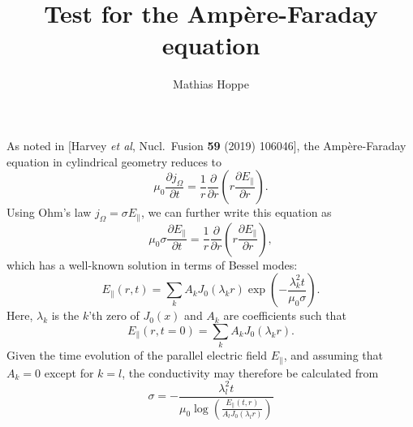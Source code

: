 \documentclass{notes}
\title{Test for the Amp\`ere-Faraday equation}
\author{Mathias Hoppe}
\begin{document}
    \maketitle

    \noindent
    As noted in [Harvey {\em et al}, Nucl.\ Fusion {\bf 59} (2019) 106046], the
    Amp\`ere-Faraday equation in cylindrical geometry reduces to
    \begin{equation}
        \mu_0\frac{\partial j_\Omega}{\partial t} = \frac{1}{r}\frac{\partial}{\partial r}\left(
            r\frac{\partial E_\parallel}{\partial r}
        \right).
    \end{equation}
    Using Ohm's law $j_\Omega = \sigma E_\parallel$, we can further write this
    equation as
    \begin{equation}
        \mu_0\sigma\frac{\partial E_\parallel}{\partial t} = \frac{1}{r}\frac{\partial}{\partial r}\left(
            r\frac{\partial E_\parallel}{\partial r}
        \right),
    \end{equation}
    which has a well-known solution in terms of Bessel modes:
    \begin{equation}
        E_\parallel(r,t) = \sum_k A_k J_0\left(\lambda_k r\right)
        \exp\left( -\frac{\lambda_k^2 t}{\mu_0\sigma} \right).
    \end{equation}
    Here, $\lambda_k$ is the $k$'th zero of $J_0(x)$ and $A_k$ are coefficients
    such that
    \begin{equation}
        E_\parallel(r,t=0) = \sum_k A_k J_0(\lambda_k r).
    \end{equation}
    Given the time evolution of the parallel electric field $E_\parallel$, and
    assuming that $A_k=0$ except for $k=l$, the conductivity may therefore be
    calculated from
    \begin{equation}
        \sigma = -\frac{\lambda_l^2 t}{\mu_0\log\left(\frac{E_\parallel(t,r)}{A_l J_0(\lambda_lr)}\right)}
    \end{equation}
\end{document}
